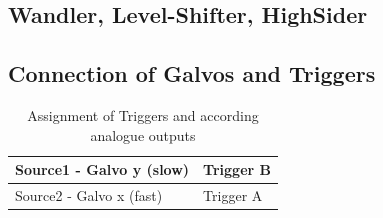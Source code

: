 \documentclass[master,english,smartquotes,apa]{hgbthesis}
\begin{document}
			\subsection{Wandler, Level-Shifter, HighSider}
			\subsection{Connection of Galvos and Triggers}
				\begin{table}[h!]
					 \begin{tabular}{|p{5.5cm}|p{6cm}|} \hline
					Source1	- Galvo y (slow)& Trigger B\\ \hline
					Source2	- Galvo x (fast)& Trigger A\\ \hline
					 \end{tabular}
					 \caption{Assignment of Triggers and according analogue outputs}
				\end{table}

		\section{}
			\subsection{}
			\subsection{}
			\subsection{}
	
\end{document}
